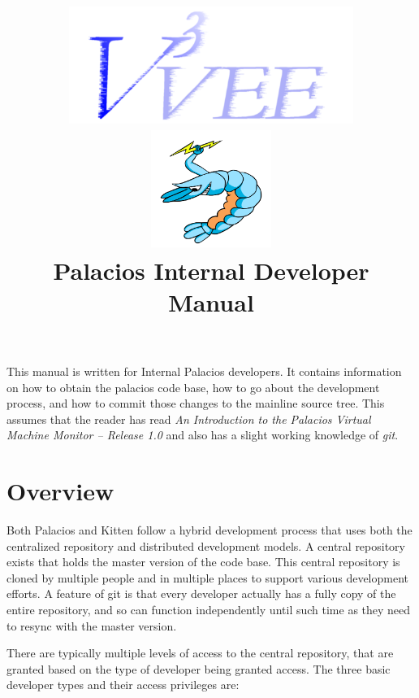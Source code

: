 \documentclass[11pt]{article}
\begin{document}
\title{
\includegraphics[height=1.5in]{v3vee.pdf}
\includegraphics[height=1.5in]{logo6.png} \\
\vspace{0.5in} 
Palacios Internal Developer Manual
}


\maketitle


This manual is written for Internal Palacios developers. It contains
information on how to obtain the palacios code base, how to go about
the development process, and how to commit those changes to the
mainline source tree.  This assumes that the reader has read {\em An
Introduction to the Palacios Virtual Machine Monitor -- Release 1.0}
and also has a slight working knowledge of {\em git}.


\section{Overview}


Both Palacios and Kitten follow a hybrid development process that
uses both the centralized repository and distributed development
models. A central repository exists that holds the master version of
the code base. This central repository is cloned by multiple people
and in multiple places to support various development efforts. A
feature of git is that every developer actually has a fully copy of
the entire repository, and so can function independently until such
time as they need to resync with the master version. 

There are typically multiple levels of access to the central
repository, that are granted based on the type of developer being
granted access. The three basic developer types and their access
privileges are:
\end{document}
